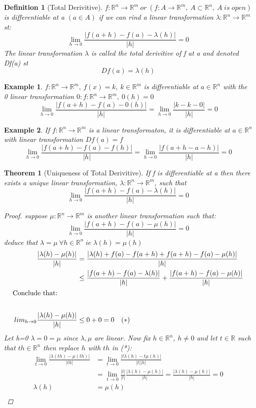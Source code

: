 \documentclass[12pt]{article}
\def\RR{\mathbb{R}}
\newtheorem{theorem}{Theorem}[section]
\newtheorem{definition}{Definition}[section]
\newtheorem{example}{Example}[section]
\begin{document}
\begin{definition}[Total Derivitive]\label{D:Total Derivitive}
$f:\RR^{n} \rightarrow \RR^{m}\: or \:(f:A \rightarrow \RR^{m}, \: A \subset \RR^{n}, \:A\;is\;open)$
is differentiable at a $(a \in A)$ if we can rind a linear transformation $ \lambda:\RR^{n} \rightarrow \RR^{m}$ st:
\[\lim_{h \to 0}\frac{|f(a+h) - f(a) - \lambda(h)|}{|h|} =0 \]
The linear transformation $\lambda$ is called the total derivitive of f at a and denoted Df(a) st
\[Df(a)=\lambda(h)\] 
\end{definition}

\begin{example} 
$f:\RR^{n} \rightarrow \RR^{m}, \: f(x)=k, \: k \in\RR^{m} $ is differentiable at $a\in\RR^{n}$ with the 0 linear transformation $0:f:\RR^{n} \rightarrow \RR^{m}, \: 0(h)=0$
\[\lim_{h \to 0}\frac{|f(a+h) - f(a) - 0(h)|}{|h|} = \lim_{h \to 0}\frac{|k - k - 0|}{|h|}= 0 \]
\end{example}

\begin{example}
If $f:\RR^{n} \rightarrow \RR^{m}$ is a linear transformaton, it is differentiable at $a\in\RR^{n}$ with linear transformation $Df(a) = f$
\[\lim_{h \to 0}\frac{|f(a+h) - f(a) - f(h)|}{|h|}= \lim_{h \to 0}\frac{|f(a+h -a -h)|}{|h|} = 0\]
\end{example}

\begin{theorem}[Uniqueness of Total Derivitive]\label{T:Uniqueness of Total Derivitive}
If f is differentiable at a then there exists a unique linear transformation, $ \lambda:\RR^{n} \rightarrow \RR^{m}$, such that
\[\lim_{h \to 0}\frac{|f(a+h) - f(a) - \lambda(h)|}{|h|} =0 \]
\begin{proof}
suppose $ \mu:\RR^{n} \rightarrow \RR^{m}$ is another linear transformation such that:
\[\lim_{h \to 0}\frac{|f(a+h) - f(a) - \mu(h)|}{|h|} =0 \]
deduce that $\lambda= \mu \:\forall h\in\RR^{n} \; ie\; \lambda(h)= \mu(h)$
\begin{align*}
\frac{|\lambda(h)- \mu(h)|}{|h|}&= \frac{|\lambda(h) +f(a) -f(a+h) +f(a+h) -f(a)- \mu(h)|}{|h|}\\
&\leq \frac{|f(a+h) -f(a) -\lambda(h)|}{|h|} +  \frac{|f(a+h) -f(a) -\mu(h)|}{|h|}\\
\shortintertext{Conclude that:} \qquad \qquad \qquad &\\
\:lim_{h \to 0}\frac{|\lambda(h)- \mu(h)|}{|h|} &\leq 0 + 0 =0 \quad (*)
\end{align*}
Let h=0 $\lambda= 0=\mu$ since $\lambda, \mu$ are linear. Now fix $h \in \RR^{n}$, $h\neq0$ and let $t\in\RR$ such that $th\in\RR^{n} $ then replace $h$ with $th$ in (*):
\begin{align*}
\lim_{t \to 0}\frac{|\lambda(th)- \mu(th)|}{|th|}&= \lim_{t \to 0}\frac{|t\lambda(h)- t\mu(h)|}{|t||h|}\\
&= \lim_{t \to 0}\frac{|t|}{|t|}\frac{|\lambda(h)- \mu(h)|}{|h|}= \frac{|\lambda(h)- \mu(h)|}{|h|} = 0\\
\lambda(h)&=\mu(h)\\
\end{align*}
\end{proof}
\end{theorem}
\end{document}
